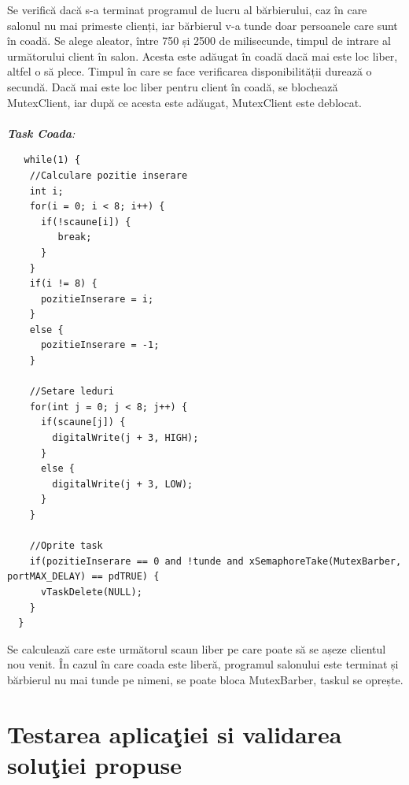 \documentclass[a4paper, 11pt]{article}
\begin{document}
{{Se verifică dacă s-a terminat programul de lucru al bărbierului, caz în care salonul nu mai primeste clienți, iar bărbierul v-a tunde doar persoanele care sunt în coadă. Se alege aleator, între 750 și 2500 de milisecunde, timpul de intrare al următorului client în salon. Acesta este adăugat în coadă dacă mai este loc liber, altfel o să plece. Timpul în care se face verificarea disponibilității durează o secundă. Dacă mai este loc liber pentru client în coadă, se blochează MutexClient, iar după ce acesta este adăugat, MutexClient este deblocat.
\paragraph{}

{\large\it \textbf{Task Coada}:}
{\small
\begin{verbatim}
   while(1) {
    //Calculare pozitie inserare
    int i;
    for(i = 0; i < 8; i++) {
      if(!scaune[i]) {
         break;
      }
    }
    if(i != 8) {
      pozitieInserare = i; 
    }
    else {
      pozitieInserare = -1;
    }     

    //Setare leduri
    for(int j = 0; j < 8; j++) {
      if(scaune[j]) {
        digitalWrite(j + 3, HIGH);   
      }
      else {
        digitalWrite(j + 3, LOW); 
      }
    }

    //Oprite task
    if(pozitieInserare == 0 and !tunde and xSemaphoreTake(MutexBarber, portMAX_DELAY) == pdTRUE) {
      vTaskDelete(NULL);
    }
  }
\end{verbatim}

Se calculează care este următorul scaun liber pe care poate să se așeze clientul nou venit. În cazul în care coada este liberă, programul salonului este terminat și bărbierul nu mai tunde pe nimeni, se poate bloca MutexBarber, taskul se oprește.
\paragraph{}\paragraph{}\paragraph{}

}



\section{Testarea aplica\c{t}iei si validarea solu\c{t}iei propuse}

}}
\end{document}
